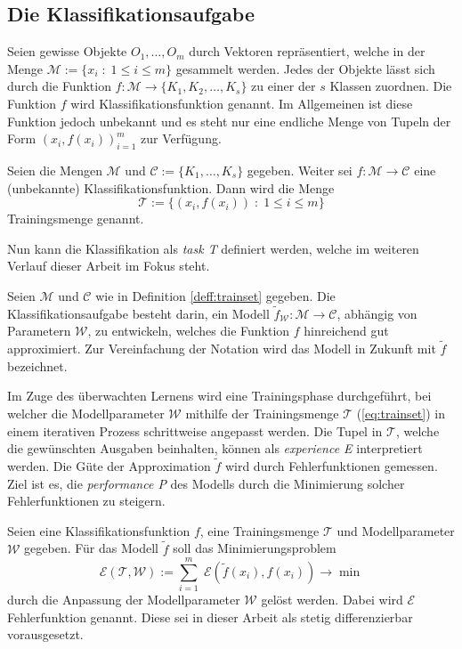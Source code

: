 \subsection{Die Klassifikationsaufgabe}
\label{abs:classtask}
Seien gewisse Objekte $O_1, \ldots, O_m$ durch Vektoren repräsentiert, welche in der Menge $\mathcal{M}:=\{x_i \; : \; 1 \leq i \leq m \}$ gesammelt werden. Jedes der Objekte lässt sich durch die Funktion $f:\mathcal{M} \rightarrow \{K_1, K_2, \ldots, K_s\}$ zu einer der $s$ Klassen zuordnen. Die Funktion $f$ wird Klassifikationsfunktion genannt. Im Allgemeinen ist diese Funktion jedoch unbekannt und es steht nur eine endliche Menge von Tupeln der Form $(x_i, f(x_i))_{i=1}^m$ zur Verfügung. 
\begin{defi}[Trainingsmenge]
    \label{deff:trainset}
    Seien die Mengen $\mathcal{M}$ und $\mathcal{C}:=\{K_1, \ldots, K_s \}$ gegeben. Weiter sei $f: \mathcal{M} \rightarrow \mathcal{C}$ eine (unbekannte) Klassifikationsfunktion. Dann wird die Menge 
    \begin{equation}
        \label{eq:trainset}
        \mathcal{T}:=\{(x_i, f(x_i))\; : \; 1 \leq i \leq m\}
    \end{equation} Trainingsmenge genannt. 
\end{defi}
Nun kann die Klassifikation als \textit{task T} definiert werden, welche im weiteren Verlauf dieser Arbeit im Fokus steht.
\begin{defi}[Klassifikationsaufgabe]
    Seien $\mathcal{M}$ und $\mathcal{C}$ wie in Definition \ref{deff:trainset} gegeben. Die Klassifikationsaufgabe besteht darin, ein Modell $\tilde{f}_{\mathcal{W}}:\mathcal{M} \rightarrow \mathcal{C}$, abhängig von Parametern $\mathcal{W}$, zu entwickeln, welches die Funktion $f$ hinreichend gut approximiert. Zur Vereinfachung der Notation wird das Modell in Zukunft mit $\tilde{f}$ bezeichnet.
\end{defi}
Im Zuge des überwachten Lernens wird eine Trainingsphase durchgeführt, bei welcher die Modellparameter $\mathcal{W}$ mithilfe der Trainingsmenge $\mathcal{T}$ (\ref{eq:trainset}) in einem iterativen Prozess schrittweise angepasst werden. Die Tupel in $\mathcal{T}$, welche die gewünschten Ausgaben beinhalten, können als \textit{experience E} interpretiert werden.
Die Güte der Approximation $\tilde{f}$ wird durch Fehlerfunktionen gemessen. Ziel ist es, die \textit{performance P} des Modells durch die Minimierung solcher Fehlerfunktionen zu steigern.  
\begin{defi}
    Seien eine Klassifikationsfunktion $f$, eine Trainingsmenge $\mathcal{T}$ und Modellparameter $\mathcal{W}$ gegeben. Für das Modell $\tilde{f}$ soll das Minimierungsproblem 
    \begin{equation}
        \label{eq:opt_fund_abs}
        \mathcal{E}(\mathcal{T}, \mathcal{W}):=\sum_{i=1}^m \; \mathcal{E}(\tilde{f}(x_i),f(x_i)) \rightarrow \min
    \end{equation}
    durch die Anpassung der Modellparameter $\mathcal{W}$ gelöst werden. Dabei wird $\mathcal{E}$ Fehlerfunktion genannt. Diese sei in dieser Arbeit als stetig differenzierbar vorausgesetzt.
\end{defi}
